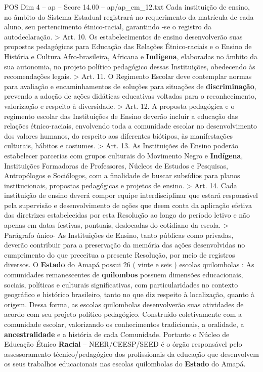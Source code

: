\begin{textsample}{POS Dim 4 – ap – Score 14.00 – ap/ap\_em\_12.txt}
Cada instituição de ensino, no âmbito do Sistema Estadual registrará no requerimento da matrícula de cada aluno, seu pertencimento étnico-racial, garantindo -se o registro da autodeclaração. > Art. 10.
Os estabelecimentos de ensino desenvolverão suas propostas pedagógicas para Educação das Relações Étnico-raciais e o Ensino de História e Cultura Afro-brasileira, Africana e \textbf{Indígena}, elaboradas no âmbito da sua autonomia, no projeto político pedagógico dessas Instituições, obedecendo às recomendações legais. > Art. 11.
O Regimento Escolar deve contemplar normas para avaliação e encaminhamentos de soluções para situações de \textbf{discriminação}, prevendo a adoção de ações didáticas educativas voltadas para o reconhecimento, valorização e respeito à diversidade. > Art. 12.
A proposta pedagógica e o regimento escolar das Instituições de Ensino deverão incluir a educação das relações étnico-raciais, envolvendo toda a comunidade escolar no desenvolvimento dos valores humanos, do respeito aos diferentes biótipos, às manifestações culturais, hábitos e costumes. > Art. 13.
As Instituições de Ensino poderão estabelecer parcerias com grupos culturais do Movimento Negro e \textbf{Indígena}, Instituições Formadoras de Professores, Núcleos de Estudos e Pesquisas, Antropólogos e Sociólogos, com a finalidade de buscar subsídios para planos institucionais, propostas pedagógicas e projetos de ensino. > Art. 14.
Cada instituição de ensino deverá compor equipe interdisciplinar que estará responsável pela supervisão e desenvolvimento de ações que deem conta da aplicação efetiva das diretrizes estabelecidas por esta Resolução ao longo do período letivo e não apenas em datas festivas, pontuais, deslocadas do cotidiano da escola. > Parágrafo único- As Instituições de Ensino, tanto públicas como privadas, deverão contribuir para a preservação da memória das ações desenvolvidas no cumprimento do que preceitua a presente Resolução, por meio de registros diversos.
O \textbf{Estado} do Amapá possui 26 ( vinte e seis ) escolas quilombolas : As comunidades remanescentes de \textbf{quilombos} possuem dimensões educacionais, sociais, políticas e culturais significativas, com particularidades no contexto geográfico e histórico brasileiro, tanto no que diz respeito à localização, quanto à origem.
Dessa forma, as escolas quilombolas desenvolverão suas atividades de acordo com seu projeto político pedagógico.
Construído coletivamente com a comunidade escolar, valorizando os conhecimentos tradicionais, a oralidade, a \textbf{ancestralidade} e a história de cada Comunidade.
Portanto o Núcleo de Educação Étnico \textbf{Racial} – NEER/CEESP/SEED é o órgão responsável pelo assessoramento técnico/pedagógico dos profissionais da educação que desenvolvem os seus trabalhos educacionais nas escolas quilombolas do \textbf{Estado} do Amapá.

\end{textsample}
